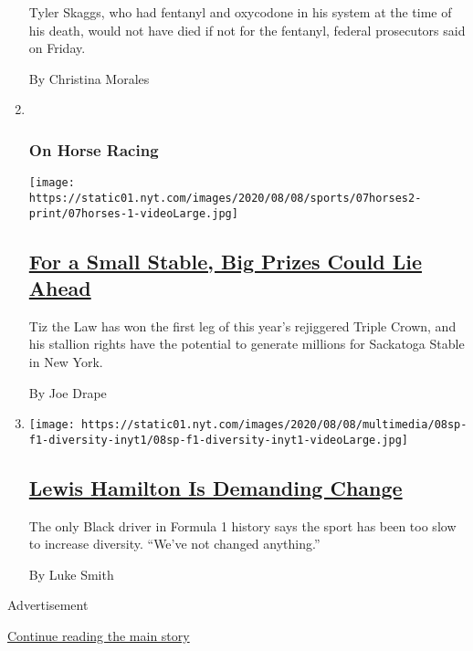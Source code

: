 \begin{enumerate}
  Tyler Skaggs, who had fentanyl and oxycodone in his system at the time
  of his death, would not have died if not for the fentanyl, federal
  prosecutors said on Friday.

  By Christina Morales
\item ~
  \hypertarget{on-horse-racing}{%
  \subsubsection{On Horse Racing}\label{on-horse-racing}}

  \texttt{[image: https://static01.nyt.com/images/2020/08/08/sports/07horses2-print/07horses-1-videoLarge.jpg]}

  \hypertarget{for-a-small-stable-big-prizes-could-lie-ahead}{%
  \subsection{\texorpdfstring{\href{/2020/08/07/sports/tiz-the-law-millions.html}{For
  a Small Stable, Big Prizes Could Lie
  Ahead}}{For a Small Stable, Big Prizes Could Lie Ahead}}\label{for-a-small-stable-big-prizes-could-lie-ahead}}

  Tiz the Law has won the first leg of this year's rejiggered Triple
  Crown, and his stallion rights have the potential to generate millions
  for Sackatoga Stable in New York.

  By Joe Drape
\item
  \texttt{[image: https://static01.nyt.com/images/2020/08/08/multimedia/08sp-f1-diversity-inyt1/08sp-f1-diversity-inyt1-videoLarge.jpg]}

  \hypertarget{lewis-hamilton-is-demanding-change}{%
  \subsection{\texorpdfstring{\href{/2020/08/07/sports/autoracing/lewis-hamilton-formula-1-diversity.html}{Lewis
  Hamilton Is Demanding
  Change}}{Lewis Hamilton Is Demanding Change}}\label{lewis-hamilton-is-demanding-change}}

  The only Black driver in Formula 1 history says the sport has been too
  slow to increase diversity. ``We've not changed anything.''

  By Luke Smith
\end{enumerate}

Advertisement

\protect\hyperlink{after-mid1}{Continue reading the main story}


